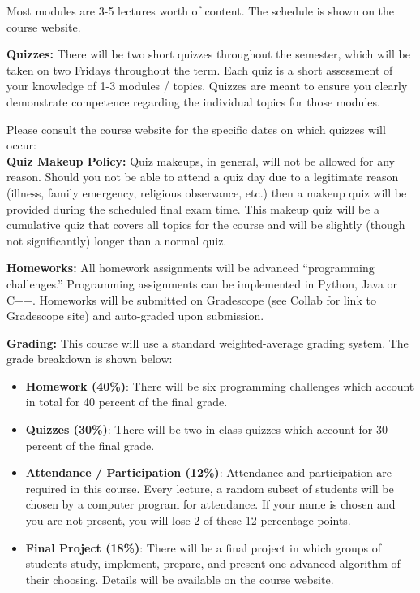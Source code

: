 \documentclass[12pt]{article}
\begin{document}
Most modules are 3-5 lectures worth of content. The schedule is shown on the course website. 

\textbf{Quizzes:}  There will be two short quizzes throughout the semester, which will be taken on two Fridays throughout the term. Each quiz is a short assessment of your knowledge of 1-3 modules / topics. Quizzes are meant to ensure you clearly demonstrate competence regarding the individual topics for those modules.

Please consult the course website for the specific dates on which quizzes will occur:\\

\textbf{Quiz Makeup Policy:} Quiz makeups, in general, will not be allowed for any reason. Should you not be able to attend a quiz day due to a legitimate reason (illness, family emergency, religious observance, etc.) then a makeup quiz will be provided during the scheduled final exam time. This makeup quiz will be a cumulative quiz that covers all topics for the course and will be slightly (though not significantly) longer than a normal quiz.

\textbf{Homeworks:} All homework assignments will be advanced ``programming challenges.'' Programming assignments can be implemented in Python, Java or C++. Homeworks will be submitted on Gradescope (see Collab for link to Gradescope site) and auto-graded upon submission.

\textbf{Grading:} This course will use a standard weighted-average grading system. The grade breakdown is shown below:

\begin{itemize}
    \item \textbf{Homework (40\%)}: There will be six programming challenges which account in total for 40 percent of the final grade.
    \item \textbf{Quizzes (30\%)}: There will be two in-class quizzes which account for 30 percent of the final grade.
    \item \textbf{Attendance / Participation (12\%)}: Attendance and participation are required in this course. Every lecture, a random subset of students will be chosen by a computer program for attendance. If your name is chosen and you are not present, you will lose 2 of these 12 percentage points.
    \item \textbf{Final Project (18\%)}: There will be a final project in which groups of students study, implement, prepare, and present one advanced algorithm of their choosing. Details will be available on the course website.
\end{itemize}
\end{document}
